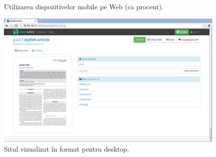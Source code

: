 \documentclass[a4wide,12pt]{report}
\begin{document}
\begin{figure}[hb]
\begin{center}
\end{center}
\caption{Utilizarea dispozitivelor mobile pe Web (ca procent)\cite{statcount}.}
\label{mobilefig}
\end{figure}

\begin{figure}
\begin{center}
\includegraphics[width=16cm]{imagini/desktop}
\end{center}
\caption{Situl vizualizat în format pentru desktop.}
\label{desktopsitefig}
\end{figure}
\end{document}
